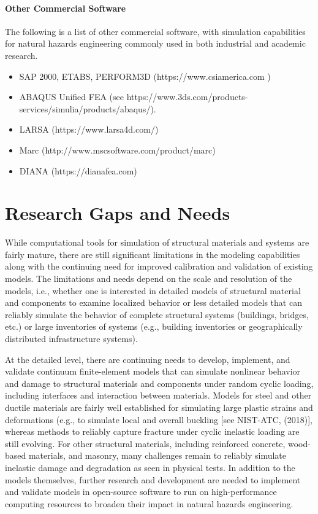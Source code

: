 \paragraph{Other Commercial Software} The following is a list of other commercial software, with simulation capabilities for natural hazards engineering commonly used in both industrial and academic research.
\begin{itemize}
    \item SAP 2000, ETABS, PERFORM3D (https://www.csiamerica.com )
    \item ABAQUS Unified FEA (see https://www.3ds.com/products-services/simulia/products/abaqus/).
    \item LARSA (https://www.larsa4d.com/)
    \item Marc (http://www.mscsoftware.com/product/marc)
    \item DIANA (https://dianafea.com)
\end{itemize}

\section{Research Gaps and Needs}
\label{sec:resp_struct_gaps}

While computational tools for simulation of structural materials and systems are fairly mature, there are still significant limitations in the modeling capabilities along with the continuing need for improved calibration and validation of existing models. The limitations and needs depend on the scale and resolution of the models, i.e., whether one is interested in detailed models of structural material and components to examine localized behavior or less detailed models that can reliably simulate the behavior of complete structural systems (buildings, bridges, etc.) or large inventories of systems (e.g., building inventories or geographically distributed infrastructure systems). 

At the detailed level, there are continuing needs to develop, implement, and validate continuum finite-element models that can simulate nonlinear behavior and damage to structural materials and components under random cyclic loading, including interfaces and interaction between materials. Models for steel and other ductile materials are fairly well established for simulating large plastic strains and deformations (e.g., to simulate local and overall buckling [see NIST-ATC, (2018)], whereas methods to reliably capture fracture under cyclic inelastic loading are still evolving. For other structural materials, including reinforced concrete, wood-based materials, and masonry, many challenges remain to reliably simulate inelastic damage and degradation as seen in physical tests. In addition to the models themselves, further research and development are needed to implement and validate models in open-source software to run on high-performance computing resources to broaden their impact in natural hazards engineering.

